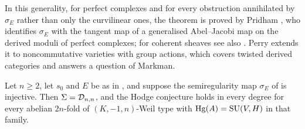 In this generality, for perfect complexes and for every obstruction
annihilated by $\sigma_{E}$ rather than only the curvilinear ones, the
theorem is proved by Pridham \cite{Pri24}, who identifies $\sigma_{E}$ with the
tangent map of a generalised Abel--Jacobi map on the derived moduli of perfect
complexes; for coherent sheaves see also \cite{BLM23}. Perry \cite{Per26}
extends it to noncommutative varieties with group actions, which covers
twisted derived categories and answers a question of Markman.

\begin{theorem}
\label{thm:semiregclosure}
Let $n\ge2$, let $s_{0}$ and $E$ be as in , and suppose the
semiregularity map $\sigma_{E}$ of  is injective. Then
$\Sigma=\mathcal{D}_{n,n}$, and the Hodge conjecture holds in every degree for every
abelian $2n$-fold of $(K,-1,n)$-Weil type with $\operatorname{Hg}(A)=\operatorname{SU}(V,H)$ in that
family.
\end{theorem}

